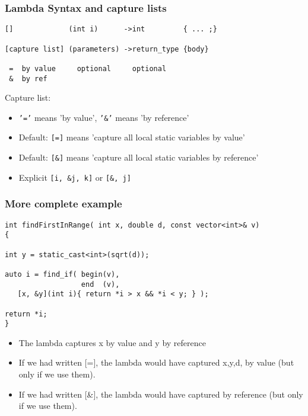 \begin{frame}[fragile,t]
\frametitle{Lambda Syntax and capture lists}

{\scriptsize
\begin{verbatim}
[]             (int i)      ->int         { ... ;}

[capture list] (parameters) ->return_type {body} 

 =  by value     optional     optional
 &  by ref      
\end{verbatim}
}

Capture list:
\begin{itemize}
\item \texttt{'='} means 'by value',  \texttt{'\&'} means 'by reference'
\item Default:  \texttt{[=]} means 'capture all local static variables by value' 
\item Default:  \texttt{[\&]} means 'capture all local static variables by reference' 
\item Explicit \texttt{[i, \&j, k]}  or \texttt{[\&, j]}  
\end{itemize}

\end{frame}

\begin{frame}[fragile,t]
\frametitle{More complete example}

{\scriptsize
\begin{verbatim}
int findFirstInRange( int x, double d, const vector<int>& v)
{

int y = static_cast<int>(sqrt(d));

auto i = find_if( begin(v), 
                  end  (v), 
   [x, &y](int i){ return *i > x && *i < y; } );

return *i;
}
\end{verbatim}
}
\pause

\begin{itemize}
\item The lambda captures x by value and y by reference
\item If we had written [=], the lambda would have captured x,y,d,
   by value (but only if we use them).
\item If we had written [\&], the lambda would have captured by
  reference (but only if we use them).
\end{itemize}

\end{frame}



